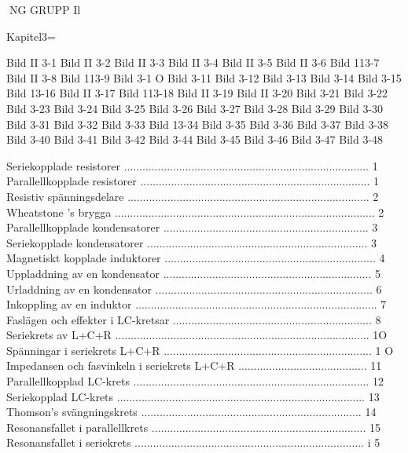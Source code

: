 \documentclass[a4paper,twoside,twocolumn,openright]{book}
\begin{document}
{{{{{{{{{{{NG
GRUPP Il

Kapitel3=

Bild II 3-1
Bild II 3-2
Bild II 3-3
Bild II 3-4
Bild II 3-5
Bild II 3-6
Bild 113-7
Bild II 3-8
Bild 113-9
Bild 3-1 O
Bild 3-11
Bild 3-12
Bild 3-13
Bild 3-14
Bild 3-15
Bild 13-16
Bild II 3-17
Bild 113-18
Bild II 3-19
Bild II 3-20
Bild 3-21
Bild 3-22
Bild 3-23
Bild 3-24
Bild 3-25
Bild 3-26
Bild 3-27
Bild 3-28
Bild 3-29
Bild 3-30
Bild 3-31
Bild 3-32
Bild 3-33
Bild 13-34
Bild 3-35
Bild 3-36
Bild 3-37
Bild 3-38
Bild 3-40
Bild 3-41
Bild 3-42
Bild 3-44
Bild 3-45
Bild 3-46
Bild 3-47
Bild 3-48

Seriekopplade resistorer ................................................................................ 1
Parallellkopplade resistorer ........................................................................... 1
Resistiv spänningsdelare ............................................................................... 2
Wheatstone 's brygga ..................................................................................... 2
Parallellkopplade kondensatorer ................................................................... 3
Seriekopplade kondensatorer ........................................................................ 3
Magnetiskt kopplade induktorer ..................................................................... 4
Uppladdning av en kondensator .................................................................... 5
Urladdning av en kondensator ....................................................................... 6
Inkoppling av en induktor ............................................................................... 7
Faslägen och effekter i LC-kretsar ................................................................. 8
Seriekrets av L+C+R ................................................................................... 1O
Spänningar i seriekrets L+C+R .................................................................... 1 O
Impedansen och fasvinkeln i seriekrets L+C+R .......................................... 11
Parallellkopplad LC-krets ............................................................................. 12
Seriekopplad LC-krets ................................................................................. 13
Thomson's svängningskrets ........................................................................ 14
Resonansfallet i parallellkrets ...................................................................... 15
Resonansfallet i seriekrets ........................................................................... i 5
}}}}}}}}}}}
\end{document}
